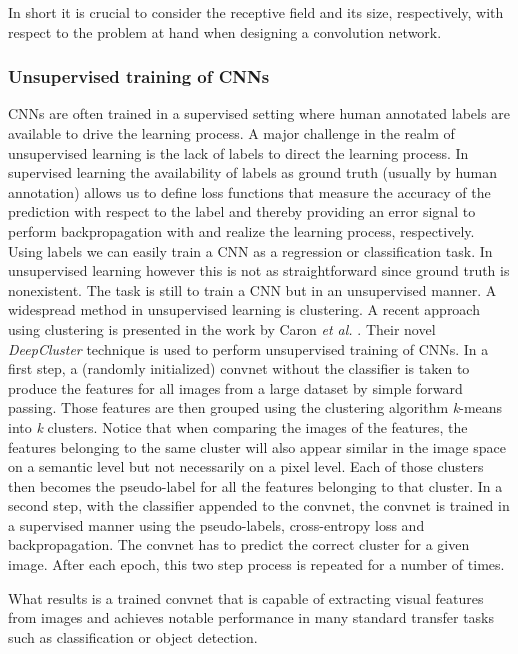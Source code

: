 \documentclass[12pt,a4paper]{article}
\begin{document}
In short it is crucial to consider the receptive field and its size, respectively, with respect to the problem at hand when designing a convolution network.


\subsubsection{Unsupervised training of CNNs}\label{subsec:deepcluster}
CNNs are often trained in a supervised setting where human annotated labels are available to drive the learning process. A major challenge in the realm of unsupervised learning is the lack of labels to direct the learning process. In supervised learning the availability of labels as ground truth (usually by human annotation) allows us to define loss functions that measure the accuracy of the prediction with respect to the label and thereby providing an error signal to perform backpropagation with and realize the learning process, respectively. Using labels we can easily train a CNN as a regression or classification task. In unsupervised learning however this is not as straightforward since ground truth is nonexistent. The task is still to train a CNN but in an unsupervised manner. A widespread method in unsupervised learning is clustering. A recent approach using clustering is presented in the work by Caron \textit{et al.} \cite{DeepCluster}. Their novel \textit{DeepCluster} technique is used to perform unsupervised training of CNNs. In a first step, a (randomly initialized) convnet without the classifier is taken to produce the features for all images from a large dataset by simple forward passing. Those features are then grouped using the clustering algorithm \textit{k}-means into \textit{k} clusters. Notice that when comparing the images of the features, the features belonging to the same cluster will also appear similar in the image space on a semantic level but not necessarily on a pixel level. Each of those clusters then becomes the pseudo-label for all the features belonging to that cluster. In a second step, with the classifier appended to the convnet, the convnet is trained in a supervised manner using the pseudo-labels, cross-entropy loss and backpropagation. The convnet has to predict the correct cluster for a given image. After each epoch, this two step process is repeated for a number of times. 
\par What results is a trained convnet that is capable of extracting visual features from images and achieves notable performance in many standard transfer tasks such as classification or object detection.
\end{document}
